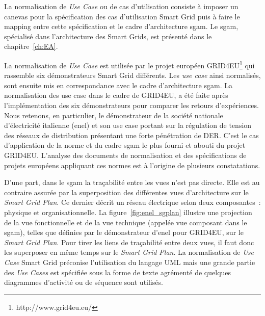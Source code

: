 La normalisation de \textit{Use Case} ou de cas d'utilisation consiste à
imposer un canevas pour la spécification des cas d'utilisation Smart Grid puis à
faire le mapping entre cette spécification et le cadre d'architecture
\gls{sgam}. Le \gls{sgam}, spécialisé dans l'architecture des Smart Grids, est
présenté dans le chapitre~\ref{ch:EA}.

La normalisation de \textit{Use Case} est utilisée par le projet européen
GRID4EU\footnote{http://www.grid4eu.eu/} qui rassemble six démonstrateurs Smart
Grid différents. Les \textit{use case} ainsi normalisés, sont ensuite mis en
correspondance avec le cadre d'architecture \gls{sgam}. La normalisation des use
case dans le cadre de GRID4EU, a été faite après l'implémentation des six
démonstrateurs pour comparer les retours d'expériences. Nous retenons, en
particulier, le démonstrateur de la société nationale d'électricité italienne
(\gls{enel}) et son use case portant sur la régulation de tension des réseaux de
distribution présentant une forte pénétration de DER. C'est le cas d'application
de la norme et du cadre \gls{sgam} le plus fourni et abouti du projet GRID4EU.
L'analyse des documents de normalisation et des spécifications de projets
européens appliquant ces normes est à l'origine de plusieurs constatations.

D'une part, dans le \gls{sgam} la traçabilité entre les vues n'est pas directe.
Elle est au contraire assurée par la superposition des différentes vues
d'architecture sur le \textit{Smart Grid Plan}. Ce dernier décrit un réseau
électrique selon deux composantes~: physique et organisationnelle. La
figure~\ref{fig:enel_sgplan} illustre une projection de la vue fonctionnelle et
de la vue technique (appelée vue composant dans le \gls{sgam}), telles que
définies par le démonstrateur d'\gls{enel} pour GRID4EU, sur le \textit{Smart
Grid Plan}. Pour tirer les liens de traçabilité entre deux vues, il faut donc
les superposer en même temps sur le \textit{Smart Grid Plan}. La normalisation
de \textit{Use Case} Smart Grid préconise l'utilisation du langage UML mais une
grande partie des \textit{Use Cases} est spécifiée sous la forme de texte
agrémenté de quelques diagrammes d'activité ou de séquence sont utilisés.

